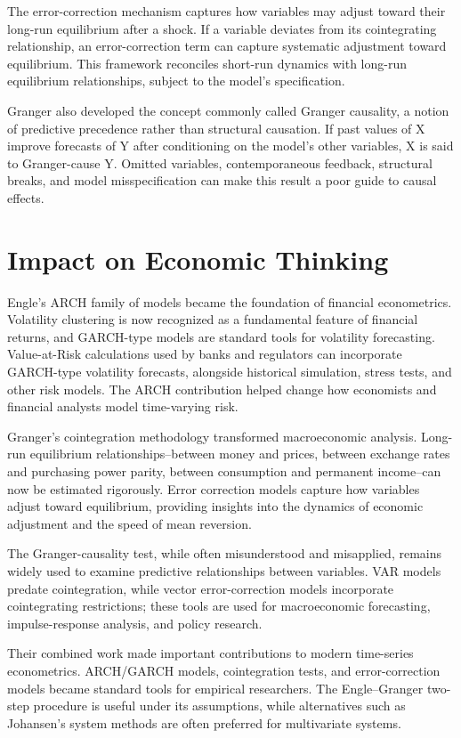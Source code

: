 The error-correction mechanism captures how variables may adjust toward their
long-run equilibrium after a shock. If a variable deviates from its
cointegrating relationship, an error-correction term can capture systematic
adjustment toward equilibrium. This framework reconciles short-run dynamics with
long-run equilibrium relationships, subject to the model's specification.

Granger also developed the concept commonly called Granger causality, a notion
of predictive precedence rather than structural causation. If past values of X
improve forecasts of Y after conditioning on the model's other variables, X is
said to Granger-cause Y. Omitted variables, contemporaneous feedback, structural
breaks, and model misspecification can make this result a poor guide to causal
effects.

\section{Impact on Economic Thinking}
Engle's ARCH family of models became the foundation of financial econometrics.
Volatility clustering is now recognized as a fundamental feature of financial
returns, and GARCH-type models are standard tools for volatility forecasting.
Value-at-Risk calculations used by banks and regulators can incorporate
GARCH-type volatility forecasts, alongside historical simulation, stress tests,
and other risk models. The ARCH contribution helped change how economists and
financial analysts model time-varying risk.

Granger's cointegration methodology transformed macroeconomic analysis.
Long-run equilibrium relationships--between money and prices, between exchange
rates and purchasing power parity, between consumption and permanent income--can
now be estimated rigorously. Error correction models capture how variables
adjust toward equilibrium, providing insights into the dynamics of economic
adjustment and the speed of mean reversion.

The Granger-causality test, while often misunderstood and misapplied, remains
widely used to examine predictive relationships between variables. VAR models
predate cointegration, while vector error-correction models incorporate
cointegrating restrictions; these tools are used for macroeconomic forecasting,
impulse-response analysis, and policy research.

Their combined work made important contributions to modern time-series
econometrics. ARCH/GARCH models, cointegration tests, and error-correction models
became standard tools for empirical researchers. The Engle--Granger two-step
procedure is useful under its assumptions, while alternatives such as Johansen's
system methods are often preferred for multivariate systems.

